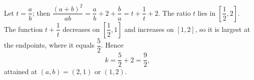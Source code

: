 Let $t=\dfrac {a}{b}$; then $\dfrac{(a+b)^2}{ab}=\dfrac {a}{b}+2+\dfrac {b}{a}=t+\dfrac{1}{t}+2$. The ratio $t$ lies in $\left[\dfrac{1}{2},2\right]$. The function $t+\dfrac{1}{t}$ decreases on $\left[\dfrac{1}{2},1\right]$ and increases on $[1,2]$, so it is largest at the endpoints, where it equals $\dfrac{5}{2}$. Hence
\[
k=\dfrac{5}{2}+2=\boxed{\dfrac{9}{2}},
\]
attained at $(a,b)=(2,1)$ or $(1,2)$.
